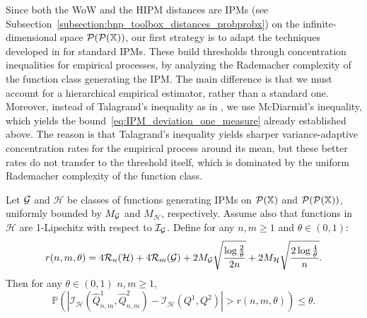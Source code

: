Since both the WoW and the HIPM distances are IPMs (see Subsection~\ref{subsection:bnp_toolbox_distances_probprobx}) on the infinite-dimensional space $\mathcal{P}(\mathcal{P}(\mathbb{X}))$, our first strategy is to adapt the techniques developed in \cite{sriperumbudur2012empirical} for standard IPMs. These build thresholds through concentration inequalities for empirical processes, by analyzing the Rademacher complexity of the function class generating the IPM. The main difference is that we must account for a hierarchical empirical estimator, rather than a standard one. Moreover, instead of Talagrand's inequality as in \citet[Proposition B.1]{sriperumbudur2012empirical}, we use McDiarmid's inequality, which yields the bound~\eqref{eq:IPM_deviation_one_measure} already established above. The reason is that Talagrand's inequality yields sharper variance-adaptive concentration rates for the empirical process around its mean, but these better rates do not transfer to the threshold itself, which is dominated by the uniform Rademacher complexity of the function class.
\begin{theorem}\label{theorem:radem_threshold_ipm_hierarchical_measures}
Let $\mathcal{G}$ and $\mathcal{H}$ be classes of functions generating IPMs on $\mathcal{P}(\mathbb{X})$ and $\mathcal{P}(\mathcal{P}(\mathbb{X}))$, uniformly bounded by $M_{\mathcal{G}}$ and $M_\mathcal{H}$, respectively. Assume also that functions in $\mathcal{H}$ are 1-Lipschitz with respect to $\mathcal{I}_{\mathcal{G}}$. Define for any $n, m \geq 1$ and $\theta \in (0,1)$:
\[
r(n, m, \theta) = 4 \mathcal{R}_n(\mathcal{H}) + 4 \mathcal{R}_m(\mathcal{G}) + 2 M_{\mathcal{G}} \sqrt{\frac{\log \frac{2}{\theta}}{2n}} +
2 M_\mathcal{H} \sqrt{\frac{2 \log \frac{4}{\theta}}{n}}.
\]
Then for any $\theta \in (0,1)$ $n,m\geq 1$,
\[
\mathbb{P}\left( \left| \mathcal{I}_{\mathcal{H}}(\widehat{Q}^1_{n,m}, \widehat{Q}^2_{n,m}) - \mathcal{I}_{\mathcal{H}}(Q^1,Q^2) \right| > r(n,m,\theta)\right) \leq \theta.
\]
\end{theorem}
